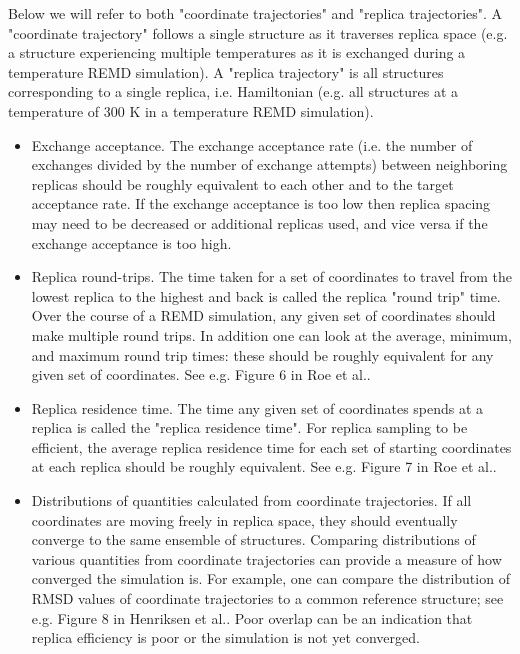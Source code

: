 Below we will refer to both "coordinate trajectories" and "replica trajectories". A "coordinate trajectory" follows a single structure as it traverses replica space (e.g. a structure experiencing multiple temperatures as it is exchanged during a temperature REMD simulation). A "replica trajectory" is all structures corresponding to a single replica, i.e. Hamiltonian (e.g. all structures at a temperature of 300 K in a temperature REMD simulation).

\begin{itemize}
  \item Exchange acceptance. The exchange acceptance rate (i.e. the number of exchanges divided by the number of exchange attempts) between neighboring replicas should be roughly equivalent to each other and to the target acceptance rate. If the exchange acceptance is too low then replica spacing may need to be decreased or additional replicas used, and vice versa if the exchange acceptance is too high.
  \item Replica round-trips. The time taken for a set of coordinates to travel from the lowest replica to the highest and back is called the replica "round trip" time. Over the course of a REMD simulation, any given set of coordinates should make multiple round trips. In addition one can look at the average, minimum, and maximum round trip times: these should be roughly equivalent for any given set of coordinates. See e.g. Figure 6 in Roe et al..\citep{Roe2014}
  \item Replica residence time. The time any given set of coordinates spends at a replica is called the "replica residence time". For replica sampling to be efficient, the average replica residence time for each set of starting coordinates at each replica should be roughly equivalent. See e.g. Figure 7 in Roe et al..\citep{Roe2014}
  \item Distributions of quantities calculated from coordinate trajectories. If all coordinates are moving freely in replica space, they should eventually converge to the same ensemble of structures. Comparing distributions of various quantities from coordinate trajectories can provide a measure of how converged the simulation is. For example, one can compare the distribution of RMSD values of coordinate trajectories to a common reference structure; see e.g. Figure 8 in Henriksen et al..\citep{Henriksen2013} Poor overlap can be an indication that replica efficiency is poor or the simulation is not yet converged.
\end{itemize}

